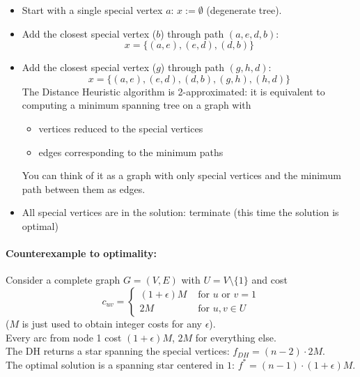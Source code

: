 \documentclass[11pt]{article}
\begin{document}
	\begin{itemize}
		\item Start with a single special vertex $a$: $x := \emptyset$ (degenerate tree).\\
		
		\item Add the closest special vertex ($b$) through path $(a, e, d, b)$:
		$$ x = \{(a, e) , (e, d) , (d, b)\} $$
		
		\item Add the closest special vertex ($g$) through path $(g , h, d)$:
		$$ x = \{(a, e) , (e, d) , (d, b) , (g , h) , (h, d)\} $$
		The Distance Heuristic algorithm is 2-approximated: it is equivalent to computing a minimum spanning tree on a graph with
		\begin{itemize}
			\item vertices reduced to the special vertices
			\item edges corresponding to the minimum paths
		\end{itemize}
		You can think of it as a graph with only special vertices and the minimum path between them as edges.\\
		
		\item All special vertices are in the solution: terminate (this time the solution is optimal)
	\end{itemize}
	
	\newpage
	
	\paragraph{Counterexample to optimality:} Consider a complete graph $G = (V , E )$ with $U = V \setminus \{1\}$ and cost
	$$ 
	c_{uv} = \begin{cases}
		(1 + \epsilon)M & \text{ for } u \text{ or } v = 1 \\
		2M & \text{ for } u,v \in U
	\end{cases}
	$$
	($M$ is just used to obtain integer costs for any $\epsilon$).\\
	Every arc from node 1 cost $(1 + \epsilon)M$, $2M$ for everything else.\\
	
	The DH returns a star spanning the special vertices: $f_{DH} = (n − 2) \cdot 2M$.\\
	
	The optimal solution is a spanning star centered in $1$: $f^\ast = (n − 1) \cdot (1 + \epsilon)M$.
	
\end{document}
